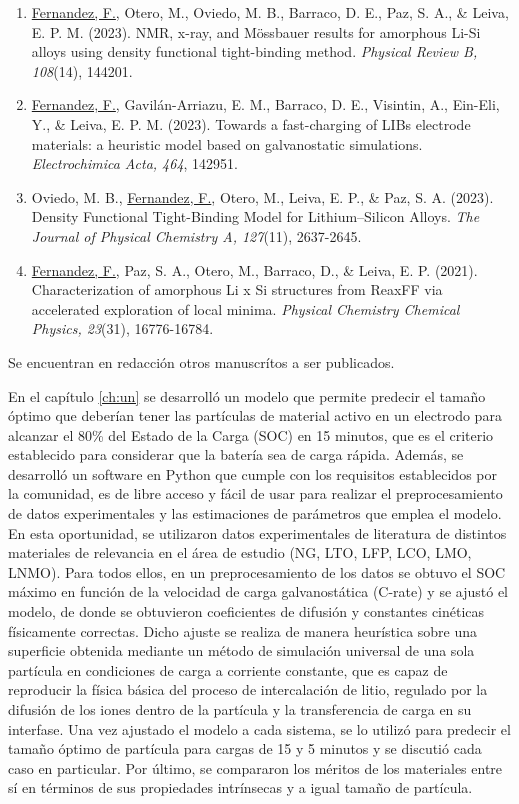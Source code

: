 \begin{enumerate}
    \item \underline{Fernandez, F.}, Otero, M., Oviedo, M. B., Barraco, D. E., Paz, S. A., \& Leiva, E. P. M. (2023). NMR, x-ray, and Mössbauer results for amorphous Li-Si alloys using density functional tight-binding method. \textit{Physical Review B, 108}(14), 144201.
    \item \underline{Fernandez, F.}, Gavilán-Arriazu, E. M., Barraco, D. E., Visintin, A., Ein-Eli, Y., \& Leiva, E. P. M. (2023). Towards a fast-charging of LIBs electrode materials: a heuristic model based on galvanostatic simulations. \textit{Electrochimica Acta, 464}, 142951.
    \item Oviedo, M. B., \underline{Fernandez, F.}, Otero, M., Leiva, E. P., \& Paz, S. A. (2023). Density Functional Tight-Binding Model for Lithium–Silicon Alloys. \textit{The Journal of Physical Chemistry A, 127}(11), 2637-2645.
    \item \underline{Fernandez, F.}, Paz, S. A., Otero, M., Barraco, D., \& Leiva, E. P. (2021). Characterization of amorphous Li x Si structures from ReaxFF via accelerated exploration of local minima. \textit{Physical Chemistry Chemical Physics, 23}(31), 16776-16784.
\end{enumerate}
Se encuentran en redacción otros manuscrítos a ser publicados.

En el capítulo \ref{ch:un} se desarrolló un modelo que permite predecir el tamaño
óptimo que deberían tener las partículas de material activo en un electrodo para 
alcanzar el 80\% del Estado de la Carga (SOC) en 15 minutos, que es el criterio
establecido para considerar que la batería sea de carga rápida. Además, se 
desarrolló un software en Python que cumple con los requisitos establecidos por 
la comunidad, es de libre acceso y fácil de usar para realizar el preprocesamiento
de datos experimentales y las estimaciones de parámetros que emplea el modelo. En esta oportunidad, se 
utilizaron datos experimentales de literatura de distintos materiales de 
relevancia en el área de estudio (NG, LTO, LFP, LCO, LMO, LNMO). Para todos ellos,
en un preprocesamiento de los datos se obtuvo el SOC máximo en función de la 
velocidad de carga galvanostática (C-rate) y se ajustó el modelo, de donde 
se obtuvieron coeficientes de difusión y constantes cinéticas físicamente 
correctas. Dicho ajuste se realiza de manera heurística sobre una superficie 
obtenida mediante un método de simulación universal de una sola partícula en 
condiciones de carga a corriente constante, que es capaz de reproducir la física 
básica del proceso de intercalación de litio, regulado por la difusión de los 
iones dentro de la partícula y la transferencia de carga en su interfase.
Una vez ajustado el modelo a cada sistema, se lo utilizó para predecir el tamaño
óptimo de partícula para cargas de 15 y 5 minutos y se discutió cada caso en 
particular. Por último, se compararon los méritos de los materiales entre sí en 
términos de sus propiedades intrínsecas y a igual tamaño de partícula.


